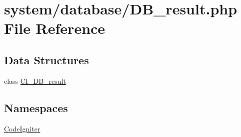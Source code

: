 \hypertarget{_d_b__result_8php}{\section{system/database/\-D\-B\-\_\-result.php File Reference}
\label{_d_b__result_8php}
}
\subsection*{Data Structures}
\begin{DoxyCompactItemize}
\item 
class \hyperlink{class_c_i___d_b__result}{C\-I\-\_\-\-D\-B\-\_\-result}
\end{DoxyCompactItemize}
\subsection*{Namespaces}
\begin{DoxyCompactItemize}
\item 
\hyperlink{namespace_code_igniter}{Code\-Igniter}
\end{DoxyCompactItemize}
